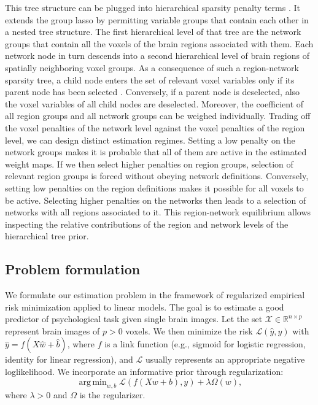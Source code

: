 \documentclass{article}
\DeclareMathOperator*{\argmin}{arg\,min}
\newcommand{\R}{\mathbb{R}}
\begin{document}
This tree structure can be plugged into
hierarchical sparsity penalty terms
\cite{jenatton2011multi}.
It extends the group lasso
\cite{yuan2006model}
by permitting variable groups that contain each other
in a nested tree structure.
The first hierarchical level of that tree are
the network groups that contain all
the voxels of the brain regions associated with them.
Each network node in turn descends into a second hierarchical level of
brain regions of spatially neighboring voxel groups.
%
As a consequence of such a region-network sparsity tree,
a child node enters the set of relevant voxel variables only
if its parent node has been selected
\cite{bach2012optimization}.
Conversely,
if a parent node is deselected,
also the voxel variables of all child nodes are deselected.
%
Moreover,
the coefficient of all region groups and all network groups can
be weighed individually.
Trading off the voxel penalties of the network level against the
voxel penalties of the region level,
we can design distinct estimation regimes.
%
Setting a low penalty on the network groups makes it is probable
that all of them are active in the estimated weight maps. If we then select
higher penalties on region groups, selection of relevant region groups is
forced without obeying network definitions.
Conversely, setting low penalties on the region definitions
makes it possible for
all voxels to be active. Selecting higher penalties on the networks then
leads to a selection of networks with all regions associated to it.
%
This region-network equilibrium allows inspecting the relative contributions
of the region and network levels
of the hierarchical tree prior.


\subsection{Problem formulation}
We formulate our estimation problem in the framework of regularized
empirical risk
minimization applied to linear models.
The goal is to estimate a good predictor of psychological task
given single brain images. Let the set \(\mathcal X\in\R^{n \times p}\) represent brain
images of \(p > 0\) voxels.
%
We then minimize the risk \(\mathcal L(\hat y, y)\) with
\(\hat y = f(X\hat w + \hat b)\), where \(f\) is a link function 
(e.g., sigmoid for logistic regression, identity for linear regression),
and \(\mathcal L\) usually represents an appropriate negative loglikelihood.
We incorporate an informative prior through regularization:
\[\argmin_{w, b} \mathcal L(f(Xw + b), y) + \lambda\Omega(w),\]
where \(\lambda > 0\) and \(\Omega\) is the regularizer.
\end{document}
